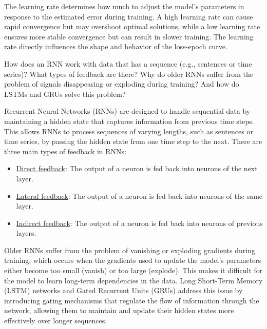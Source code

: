 \begin{ejercicio}
\begin{itemize}
        The learning rate determines how much to adjust the model's parameters in response to the estimated error during training. A high learning rate can cause rapid convergence but may overshoot optimal solutions, while a low learning rate ensures more stable convergence but can result in slower training. The learning rate directly influences the shape and behavior of the loss-epoch curve.
    \end{itemize}
    
\end{ejercicio}


\begin{ejercicio}[RNN]
    How does an RNN work with data that has a sequence (e.g., sentences or time series)? What types of feedback are there? Why do older RNNs suffer from the problem of signals disappearing or exploding during training? And how do LSTMs and GRUs solve this problem?

    Recurrent Neural Networks (RNNs) are designed to handle sequential data by maintaining a hidden state that captures information from previous time steps. This allows RNNs to process sequences of varying lengths, such as sentences or time series, by passing the hidden state from one time step to the next. There are three main types of feedback in RNNs:
    \begin{itemize}
        \item \ul{Direct feedback}: The output of a neuron is fed back into neurons of the next layer.
        \item \ul{Lateral feedback}: The output of a neuron is fed back into neurons of the same layer.
        \item \ul{Indirect feedback}: The output of a neuron is fed back into neurons of previous layers.
    \end{itemize}

    Older RNNs suffer from the problem of vanishing or exploding gradients during training, which occurs when the gradients used to update the model's parameters either become too small (vanish) or too large (explode). This makes it difficult for the model to learn long-term dependencies in the data. Long Short-Term Memory (LSTM) networks and Gated Recurrent Units (GRUs) address this issue by introducing gating mechanisms that regulate the flow of information through the network, allowing them to maintain and update their hidden states more effectively over longer sequences.
\end{ejercicio}

